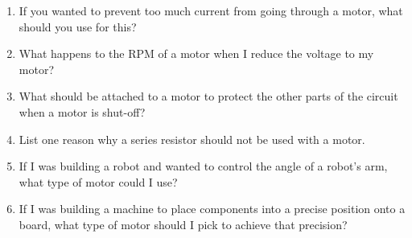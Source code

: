 \begin{enumerate}
\item If you wanted to prevent too much current from going through a motor, what should you use for this?
\item What happens to the RPM of a motor when I reduce the voltage to my motor?
\item What should be attached to a motor to protect the other parts of the circuit when a motor is shut-off?
\item List one reason why a series resistor should not be used with a motor.
\item If I was building a robot and wanted to control the angle of a robot's arm, what type of motor could I use?
\item If I was building a machine to place components into a precise position onto a board, what type of motor should I pick to achieve that precision?
\end{enumerate}
